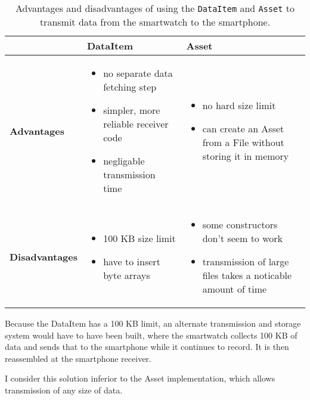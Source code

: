       \begin{table}
        \centering
        {\tabulinesep=1.2mm
        \begin{tabu} to \linewidth { X[2,c,m] | X[3,l,m] | X[3,l,m] | }
          & \textbf{DataItem} & \textbf{Asset} \\
          \hline
          \textbf{Advantages} & 
            \begin{itemize}
              \item no separate data fetching step
              \item simpler, more reliable receiver code
              \item negligable transmission time
            \end{itemize} &
            \begin{itemize}
              \item no hard size limit
              \item can create an Asset from a File without storing it in memory
            \end{itemize} \\
          \hline
          \textbf{Disadvantages} &
            \begin{itemize}
              \item 100 KB size limit
              \item have to insert byte arrays
            \end{itemize} &
            \begin{itemize}
              \item some constructors don't seem to work
              \item transmission of large files takes a noticable amount of time
            \end{itemize} \\
          \hline
        \end{tabu}}
        \caption{Advantages and disadvantages of using the \texttt{DataItem} and \texttt{Asset} to transmit data from the smartwatch to the smartphone.}
        \label{tab:dataitem-vs-asset}
      \end{table}
      
      Because the DataItem has a 100 KB limit, an alternate transmission and storage system would have to have been built, where the smartwatch collects 100 KB of data and sends that to the smartphone while it continues to record. It is then reassembled at the smartphone receiver.
      
      I consider this solution inferior to the Asset implementation, which allows transmission of any size of data.
